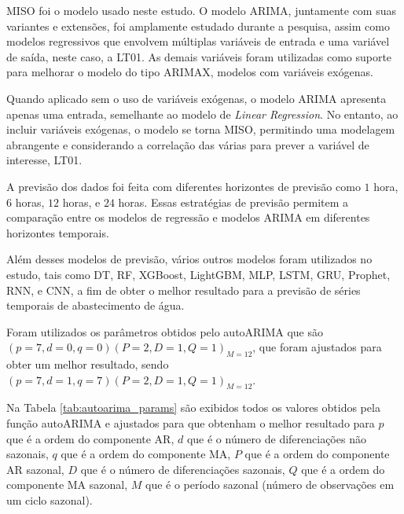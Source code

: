 


MISO foi o modelo usado neste estudo. O modelo ARIMA, juntamente com suas variantes e extensões, foi amplamente estudado durante a pesquisa, assim como modelos regressivos que envolvem múltiplas variáveis de entrada e uma variável de saída, neste caso, a LT01. As demais variáveis foram utilizadas como suporte para melhorar o modelo do tipo ARIMAX, modelos com variáveis exógenas. 

Quando aplicado sem o uso de variáveis exógenas, o modelo ARIMA apresenta apenas uma entrada, semelhante ao modelo de \textit{Linear Regression}. No entanto, ao incluir variáveis exógenas, o modelo se torna MISO, permitindo uma modelagem  abrangente e considerando a correlação das várias para prever a variável de interesse, LT01.

A previsão dos dados foi feita com diferentes horizontes de previsão como $1$ hora, $6$ horas, $12$ horas, e $24$ horas. Essas estratégias de previsão permitem a comparação entre os modelos de regressão e modelos ARIMA em diferentes horizontes temporais.

Além desses modelos de previsão, vários outros modelos foram utilizados no estudo, tais como DT, RF, XGBoost, LightGBM, MLP, LSTM, GRU, Prophet, RNN, e CNN, a fim de obter o melhor resultado para a previsão de séries temporais de abastecimento de água.

Foram utilizados os parâmetros obtidos pelo autoARIMA que são $(p = 7, d = 0, q = 0) (P = 2, D = 1, Q = 1)_{M = 12}$, que foram ajustados para obter um melhor resultado, sendo $(p = 7, d = 1, q = 7) (P = 2, D = 1, Q = 1)_{M = 12}$. 

Na Tabela \ref{tab:autoarima_params} são exibidos todos os valores obtidos pela função autoARIMA e ajustados para que obtenham o melhor resultado para $p$ que é a ordem do componente AR, $d$ que é o número de diferenciações não sazonais, $q$ que é a ordem do componente MA, $P$ que é a ordem do componente AR sazonal, $D$ que é o número de diferenciações sazonais, $Q$ que é a ordem do componente MA sazonal, $M$ que é o período sazonal (número de observações em um ciclo sazonal).

